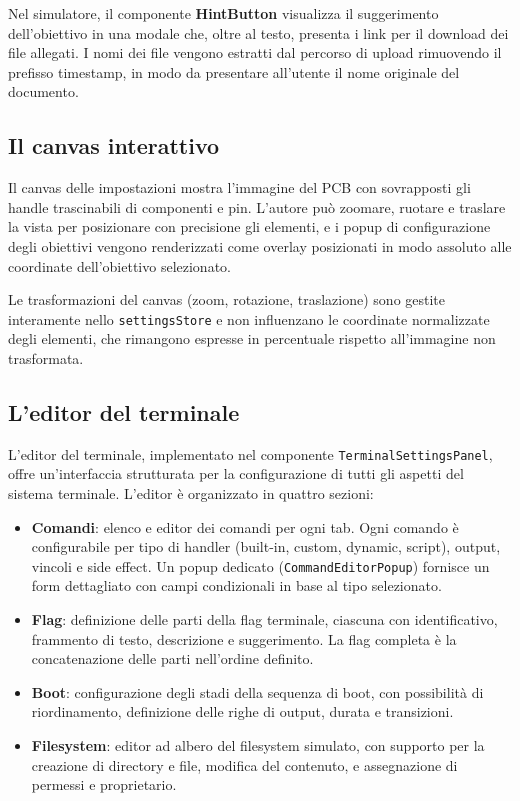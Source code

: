 Nel simulatore, il componente \textbf{HintButton} visualizza il suggerimento dell'obiettivo in una modale che, oltre al testo, presenta i link per il download dei file allegati. I nomi dei file vengono estratti dal percorso di upload rimuovendo il prefisso timestamp, in modo da presentare all'utente il nome originale del documento.

\subsection{Il canvas interattivo}

Il canvas delle impostazioni mostra l'immagine del PCB con sovrapposti gli handle trascinabili di componenti e pin. L'autore può zoomare, ruotare e traslare la vista per posizionare con precisione gli elementi, e i popup di configurazione degli obiettivi vengono renderizzati come overlay posizionati in modo assoluto alle coordinate dell'obiettivo selezionato.

Le trasformazioni del canvas (zoom, rotazione, traslazione) sono gestite interamente nello \texttt{settingsStore} e non influenzano le coordinate normalizzate degli elementi, che rimangono espresse in percentuale rispetto all'immagine non trasformata.

\subsection{L'editor del terminale}

L'editor del terminale, implementato nel componente \texttt{TerminalSettingsPanel}, offre un'interfaccia strutturata per la configurazione di tutti gli aspetti del sistema terminale. L'editor è organizzato in quattro sezioni:

\begin{itemize}
    \item \textbf{Comandi}: elenco e editor dei comandi per ogni tab. Ogni comando è configurabile per tipo di handler (built-in, custom, dynamic, script), output, vincoli e side effect. Un popup dedicato (\texttt{CommandEditorPopup}) fornisce un form dettagliato con campi condizionali in base al tipo selezionato.

    \item \textbf{Flag}: definizione delle parti della flag terminale, ciascuna con identificativo, frammento di testo, descrizione e suggerimento. La flag completa è la concatenazione delle parti nell'ordine definito.

    \item \textbf{Boot}: configurazione degli stadi della sequenza di boot, con possibilità di riordinamento, definizione delle righe di output, durata e transizioni.

    \item \textbf{Filesystem}: editor ad albero del filesystem simulato, con supporto per la creazione di directory e file, modifica del contenuto, e assegnazione di permessi e proprietario.
\end{itemize}


